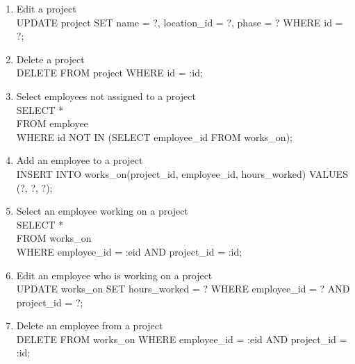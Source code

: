 \documentclass[11pt,letterpaper]{article}
\begin{document}
\begin{enumerate}
		\item Edit a project \\UPDATE project SET name = ?, location\_id = ?, phase = ? WHERE id = ?; 
		\item Delete a project \\DELETE FROM project WHERE id = :id;
		\item Select employees not assigned to a project \\SELECT * \\FROM employee \\WHERE id NOT IN (SELECT employee\_id FROM works\_on);
		\item Add an employee to a project \\INSERT INTO works\_on(project\_id, employee\_id, hours\_worked) VALUES (?, ?, ?);
		\item Select an employee working on a project \\SELECT * \\FROM works\_on \\WHERE employee\_id = :eid AND project\_id = :id;
		\item Edit an employee who is working on a project \\UPDATE works\_on SET hours\_worked = ? WHERE employee\_id = ? AND project\_id = ?; 
		\item Delete an employee from a project \\DELETE FROM works\_on WHERE employee\_id = :eid AND project\_id = :id;
	\end{enumerate}
\end{document}
